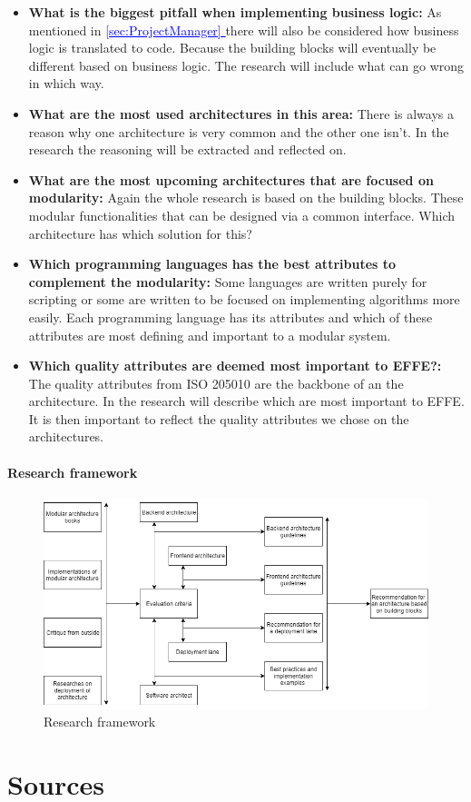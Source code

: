 \documentclass{report}
\newcommand*{\fullref}[1]{\hyperref[{#1}]{\textcolor{blue}{\underline{\ref*{#1} \nameref*{#1}}}}}
\begin{document}
\begin{itemize}
	\item \textbf{What is the biggest pitfall when implementing business logic: }As mentioned in \fullref{sec:ProjectManager} there will also be considered how business logic is translated to code. Because the building blocks will eventually be different based on business logic. The research will include what can go wrong in which way.
	
	\item \textbf{What are the most used architectures in this area: }There is always a reason why one architecture is very common and the other one isn't. In the research the reasoning will be extracted and reflected on.
	
	\item \textbf{What are the most upcoming architectures that are focused on modularity: }Again the whole research is based on the building blocks. These modular functionalities that can be designed via a common interface. Which architecture has which solution for this?
	
	\item \textbf{Which programming languages has the best attributes to complement the modularity: }Some languages are written purely for scripting or some are written to be focused on implementing algorithms more easily. Each programming language has its attributes and which of these attributes are most defining and important to a modular system.
	
	\item \textbf{Which quality attributes are deemed most important to EFFE?: }The quality attributes from ISO 205010 \cite{techreport} are the backbone of an the architecture. In the research will describe which are most important to EFFE. It is then important to reflect the quality attributes we chose on the architectures.
\end{itemize}

\subsubsection{Research framework}

\begin{figure}[h!]
	\includegraphics[width=\linewidth]{research_framework.png}
	\caption{Research framework}
\end{figure}

\chapter{Sources}

\printbibliography[heading=none]
\end{document}

